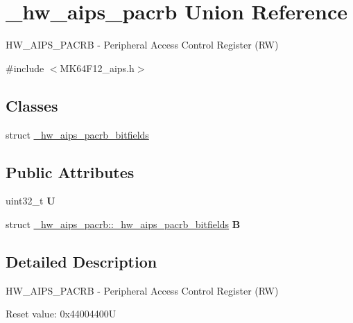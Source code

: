 \hypertarget{union__hw__aips__pacrb}{}\section{\+\_\+hw\+\_\+aips\+\_\+pacrb Union Reference}
\label{union__hw__aips__pacrb}


H\+W\+\_\+\+A\+I\+P\+S\+\_\+\+P\+A\+C\+RB -\/ Peripheral Access Control Register (RW)  




{\ttfamily \#include $<$M\+K64\+F12\+\_\+aips.\+h$>$}

\subsection*{Classes}
\begin{DoxyCompactItemize}
\item 
struct \hyperlink{struct__hw__aips__pacrb_1_1__hw__aips__pacrb__bitfields}{\+\_\+hw\+\_\+aips\+\_\+pacrb\+\_\+bitfields}
\end{DoxyCompactItemize}
\subsection*{Public Attributes}
\begin{DoxyCompactItemize}
\item 
uint32\+\_\+t {\bfseries U}\hypertarget{union__hw__aips__pacrb_a909f7412a457ae919047350287bfe8ff}{}\label{union__hw__aips__pacrb_a909f7412a457ae919047350287bfe8ff}

\item 
struct \hyperlink{struct__hw__aips__pacrb_1_1__hw__aips__pacrb__bitfields}{\+\_\+hw\+\_\+aips\+\_\+pacrb\+::\+\_\+hw\+\_\+aips\+\_\+pacrb\+\_\+bitfields} {\bfseries B}\hypertarget{union__hw__aips__pacrb_a8ca9105962fbd082afa9be6bbe80875d}{}\label{union__hw__aips__pacrb_a8ca9105962fbd082afa9be6bbe80875d}

\end{DoxyCompactItemize}


\subsection{Detailed Description}
H\+W\+\_\+\+A\+I\+P\+S\+\_\+\+P\+A\+C\+RB -\/ Peripheral Access Control Register (RW) 

Reset value\+: 0x44004400U

